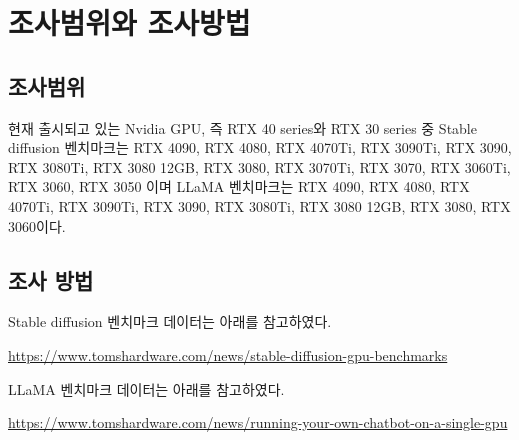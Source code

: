 \section{조사범위와 조사방법}
\subsection{조사범위}
현재 출시되고 있는 Nvidia GPU, 즉 RTX 40 series와 RTX 30 series 중 Stable diffusion 벤치마크는 RTX 4090, RTX 4080, RTX 4070Ti, RTX 3090Ti, RTX 3090, RTX 3080Ti, RTX 3080 12GB, RTX 3080, RTX 3070Ti, RTX 3070, RTX 3060Ti, RTX 3060, RTX 3050 이며 LLaMA 벤치마크는 RTX 4090, RTX 4080, RTX 4070Ti, RTX 3090Ti, RTX 3090, RTX 3080Ti, RTX 3080 12GB, RTX 3080, RTX 3060이다.

\subsection{조사 방법}
Stable diffusion 벤치마크 데이터는 아래를 참고하였다.

\href{https://www.tomshardware.com/news/stable-diffusion-gpu-benchmarks}{https://www.tomshardware.com/news/stable-diffusion-gpu-benchmarks}

LLaMA 벤치마크 데이터는 아래를 참고하였다.

\href{https://www.tomshardware.com/news/running-your-own-chatbot-on-a-single-gpu}{https://www.tomshardware.com/news/running-your-own-chatbot-on-a-single-gpu}